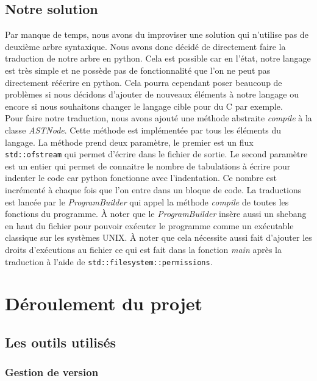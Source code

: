\documentclass[a4paper]{article}%
\begin{document}
\subsection{Notre solution}

Par manque de temps, nous avons du improviser une solution qui n'utilise pas de
deuxième arbre syntaxique. Nous avons donc décidé de directement faire la
traduction de notre arbre en python. Cela est possible car en l'état, notre
langage est très simple et ne possède pas de fonctionnalité que l'on ne peut pas
directement réécrire en python. Cela pourra cependant poser beaucoup de
problèmes si nous décidons d'ajouter de nouveaux éléments à notre langage ou
encore si nous souhaitons changer le langage cible pour du C par exemple.\\

Pour faire notre traduction, nous avons ajouté une méthode abstraite
\textit{compile} à la classe \textit{ASTNode}. Cette méthode est implémentée par
tous les éléments du langage. La méthode prend deux paramètre, le premier est un
flux \lstinline{std::ofstream} qui permet d'écrire dans le fichier de sortie. Le
second paramètre est un entier qui permet de connaitre le nombre de tabulations
à écrire pour indenter le code car python fonctionne avec l'indentation. Ce
nombre est incrémenté à chaque fois que l'on entre dans un bloque de code. La
traductions est lancée par le \textit{ProgramBuilder} qui appel la méthode
\textit{compile} de toutes les fonctions du programme. À noter que le
\textit{ProgramBuilder} insère aussi un \gls{shebang} en haut du fichier pour
pouvoir exécuter le programme comme un exécutable classique sur les systèmes
UNIX. À noter que cela nécessite aussi fait d'ajouter les droits d'exécutions au
fichier ce qui est fait dans la fonction \textit{main} après la traduction à
l'aide de \lstinline{std::filesystem::permissions}.

\section{Déroulement du projet}

\subsection{Les outils utilisés}

\subsubsection{Gestion de version}
\end{document}
